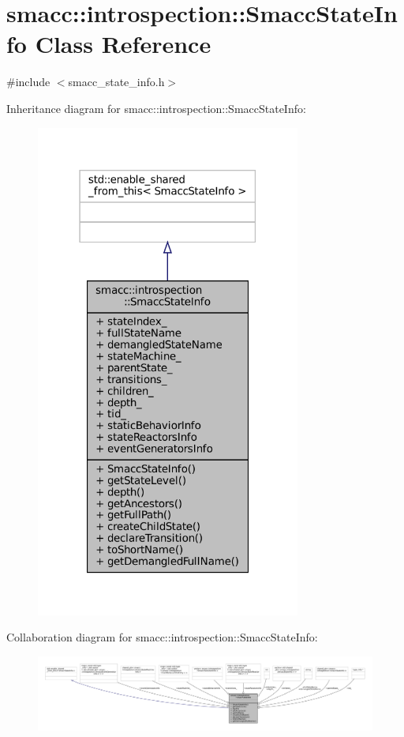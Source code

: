 \hypertarget{classsmacc_1_1introspection_1_1SmaccStateInfo}{}\section{smacc\+:\+:introspection\+:\+:Smacc\+State\+Info Class Reference}
\label{classsmacc_1_1introspection_1_1SmaccStateInfo}


{\ttfamily \#include $<$smacc\+\_\+state\+\_\+info.\+h$>$}



Inheritance diagram for smacc\+:\+:introspection\+:\+:Smacc\+State\+Info\+:
\nopagebreak
\begin{figure}[H]
\begin{center}
\leavevmode
\includegraphics[width=247pt]{classsmacc_1_1introspection_1_1SmaccStateInfo__inherit__graph}
\end{center}
\end{figure}


Collaboration diagram for smacc\+:\+:introspection\+:\+:Smacc\+State\+Info\+:
\nopagebreak
\begin{figure}[H]
\begin{center}
\leavevmode
\includegraphics[width=350pt]{classsmacc_1_1introspection_1_1SmaccStateInfo__coll__graph}
\end{center}
\end{figure}
